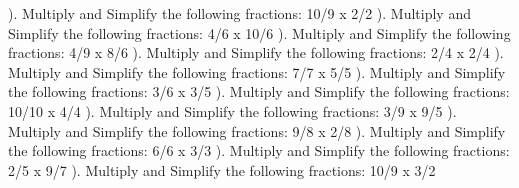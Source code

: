 \documentclass{article}%
\begin{document}
). Multiply and Simplify the following fractions: 10/9 x 2/2%
\newline%
\newline%
). Multiply and Simplify the following fractions: 4/6 x 10/6%
\newline%
\newline%
). Multiply and Simplify the following fractions: 4/9 x 8/6%
\newline%
\newline%
). Multiply and Simplify the following fractions: 2/4 x 2/4%
\newline%
\newline%
). Multiply and Simplify the following fractions: 7/7 x 5/5%
\newline%
\newline%
). Multiply and Simplify the following fractions: 3/6 x 3/5%
\newline%
\newline%
). Multiply and Simplify the following fractions: 10/10 x 4/4%
\newline%
\newline%
). Multiply and Simplify the following fractions: 3/9 x 9/5%
\newline%
\newline%
). Multiply and Simplify the following fractions: 9/8 x 2/8%
\newline%
\newline%
). Multiply and Simplify the following fractions: 6/6 x 3/3%
\newline%
\newline%
). Multiply and Simplify the following fractions: 2/5 x 9/7%
\newline%
\newline%
). Multiply and Simplify the following fractions: 10/9 x 3/2%
\newline%
\newline%
\newline%
\end{document}
